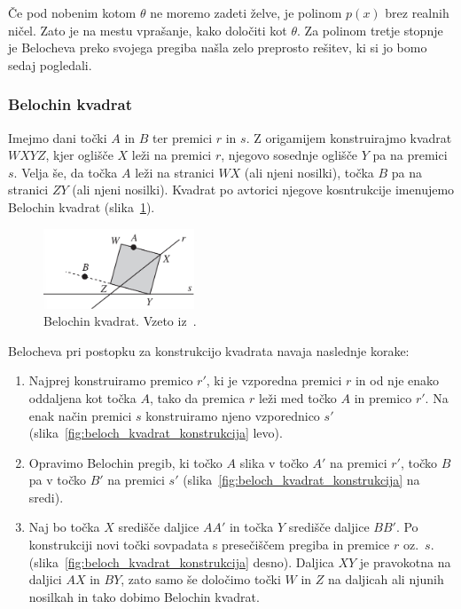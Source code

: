 Če pod nobenim kotom $\theta$ ne moremo zadeti želve, je polinom $p(x)$ brez realnih ničel. Zato je na mestu vprašanje, kako določiti kot $\theta$. Za polinom tretje stopnje je Belocheva preko svojega pregiba našla zelo preprosto rešitev, ki si jo bomo sedaj pogledali.

\subsubsection*{Belochin kvadrat}

Imejmo dani točki $A$ in $B$ ter premici $r$ in $s$. Z origamijem konstruirajmo kvadrat $WXYZ$, kjer oglišče $X$ leži na premici $r$, njegovo sosednje oglišče $Y$ pa na premici $s$. Velja še, da točka $A$ leži na stranici $WX$ (ali njeni nosilki), točka $B$ pa na stranici $ZY$ (ali njeni nosilki). Kvadrat po avtorici njegove kosntrukcije imenujemo Belochin kvadrat (slika~\ref{fig:beloch_kvadrat}).

\begin{figure}[h]
    \centering
    \includegraphics[width=0.4\textwidth]{images/kubična enačba/beloch_kvadrat.png}
    \caption[Belochin kvadrat]{Belochin kvadrat. Vzeto iz~\cite[str.\ 309]{hull2011}.}
    \label{fig:beloch_kvadrat}
\end{figure}

Belocheva pri postopku za konstrukcijo kvadrata navaja naslednje korake:
\begin{enumerate}
    \item Najprej konstruiramo premico $r'$, ki je vzporedna premici $r$ in od nje enako oddaljena kot točka $A$, tako da premica $r$ leži med točko $A$ in premico $r'$. Na enak način premici $s$ konstruiramo njeno vzporednico $s'$ (slika~\ref{fig:beloch_kvadrat_konstrukcija} levo).
    \item Opravimo Belochin pregib, ki točko $A$ slika v točko $A'$ na premici $r'$, točko $B$ pa v točko $B'$ na premici $s'$ (slika~\ref{fig:beloch_kvadrat_konstrukcija} na sredi).
    \item Naj bo točka $X$ središče daljice $AA'$ in točka $Y$ središče daljice $BB'$. Po konstrukciji novi točki sovpadata s presečiščem pregiba in premice $r$ oz.\ $s$. (slika~\ref{fig:beloch_kvadrat_konstrukcija} desno). Daljica $XY$ je pravokotna na daljici $AX$ in $BY$, zato samo še določimo točki $W$ in $Z$ na daljicah ali njunih nosilkah in tako dobimo Belochin kvadrat.
\end{enumerate}

